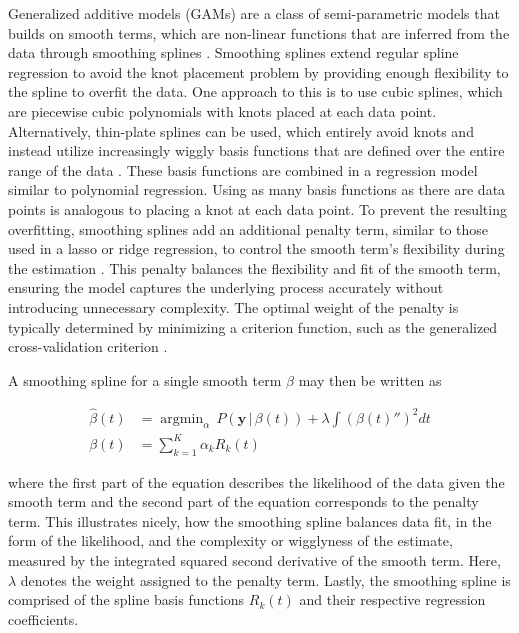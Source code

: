 \documentclass[man, floatsintext]{apa7}
\DeclareMathOperator*{\argmin}{argmin}
\begin{document}
Generalized additive models (GAMs) are a class of semi-parametric models that
builds on smooth terms, which are non-linear functions that are inferred from
the data through smoothing splines \parencite{wood_generalized_2006,
  wood_inference_2020, hastie_generalized_1999}. Smoothing splines extend
regular
spline regression to avoid the knot placement problem by providing enough
flexibility to the spline to overfit the data. One approach to this is to use
cubic splines, which are piecewise cubic polynomials with knots placed at each
data point. Alternatively, thin-plate splines can be used, which entirely avoid
knots and instead utilize increasingly wiggly basis functions that are defined
over the entire range of the data \parencite{wood_thin_2003}. These basis
functions are combined in a regression model similar to polynomial regression.
Using as many basis functions as there are data points is analogous to placing
a knot at each data point. To prevent the resulting overfitting, smoothing
splines add an additional penalty term, similar to those used in a lasso or
ridge regression, to control the smooth term's flexibility during the
estimation \parencite{gu_smoothing_2013, wahba_spline_1980}. This penalty
balances the flexibility and fit of the smooth term, ensuring the model
captures the underlying process accurately without introducing unnecessary
complexity. The optimal weight of the penalty is typically determined by
minimizing a criterion function, such as the generalized cross-validation
criterion \parencite{wood_generalized_2006, golub_generalized_1997}.

A smoothing spline for a single smooth term $\beta$ may then be written as

\begin{equation}
  \begin{aligned}
    \hat{\beta}(t) & = \argmin_\alpha \, P(\textbf{y} \, | \, \beta(t)) +
    \lambda \int {(\beta(t)'')}^2 dt                                      \\
    \beta(t)       & = \sum^K_{k = 1} \alpha_k R_k(t)
  \end{aligned}
\end{equation}

\noindent where the first part of the equation describes the likelihood
of the data given the smooth term and the second part of the equation
corresponds to the penalty term. This illustrates nicely, how the smoothing
spline balances data fit, in the form of the likelihood, and the complexity or
wigglyness of the estimate, measured by the integrated squared second
derivative of the smooth term. Here, $\lambda$ denotes the weight assigned to
the penalty term. Lastly, the smoothing spline is comprised of the spline
basis functions $R_k(t)$ and their respective regression coefficients.
\end{document}
